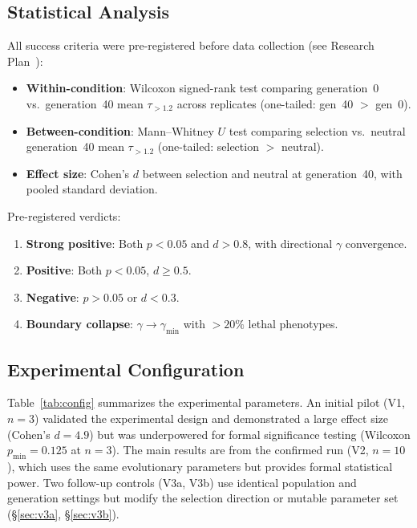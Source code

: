 \documentclass[twocolumn,showpacs,preprintnumbers,amsmath,amssymb,prd,floatfix]{revtex4-2}
\newcommand{\tauexp}{\tau_{>1.2}}
\begin{document}
\subsection{Statistical Analysis}

All success criteria were pre-registered before data collection (see Research Plan~\cite{researchplan}):

\begin{itemize}
\item \textbf{Within-condition}: Wilcoxon signed-rank test comparing generation~0 vs.\ generation~40 mean $\tauexp$ across replicates (one-tailed: gen~40 $>$ gen~0).

\item \textbf{Between-condition}: Mann--Whitney $U$ test comparing selection vs.\ neutral generation~40 mean $\tauexp$ (one-tailed: selection $>$ neutral).

\item \textbf{Effect size}: Cohen's $d$ between selection and neutral at generation~40, with pooled standard deviation.
\end{itemize}

Pre-registered verdicts:
\begin{enumerate}
\item \textbf{Strong positive}: Both $p < 0.05$ and $d > 0.8$, with directional $\gamma$ convergence.
\item \textbf{Positive}: Both $p < 0.05$, $d \geq 0.5$.
\item \textbf{Negative}: $p > 0.05$ or $d < 0.3$.
\item \textbf{Boundary collapse}: $\gamma \rightarrow \gamma_\text{min}$ with $> 20\%$ lethal phenotypes.
\end{enumerate}

\subsection{Experimental Configuration}

Table~\ref{tab:config} summarizes the experimental parameters. An initial pilot (V1, $n = 3$) validated the experimental design and demonstrated a large effect size (Cohen's $d = 4.9$) but was underpowered for formal significance testing (Wilcoxon $p_\text{min} = 0.125$ at $n = 3$). The main results are from the confirmed run (V2, $n = 10$), which uses the same evolutionary parameters but provides formal statistical power. Two follow-up controls (V3a, V3b) use identical population and generation settings but modify the selection direction or mutable parameter set (\S\ref{sec:v3a}, \S\ref{sec:v3b}).
\end{document}
